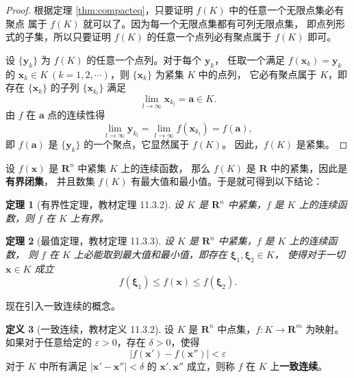 \documentclass[11pt]{ctexart}
\theoremstyle{plain}
\newtheorem{thm}{定理}[section]
\theoremstyle{definition}
\newtheorem{defn}[thm]{定义}
\theoremstyle{remark}
\begin{document}
\begin{proof}
根据定理 \ref{thm:compacteq}，只要证明 \(f(K)\) 中的任意一个无限点集必有聚点
属于 \(f(K)\) 就可以了。因为每一个无限点集都有可列无限点集，
即点列形式的子集，所以只要证明 \(f(K)\) 的任意一个点列必有聚点属于 \(f(K)\) 即可。

设 \(\{\boldsymbol{y}_k\}\) 为 \(f(K)\) 的任意一个点列。对于每个 \(\boldsymbol{y}_k\)，
任取一个满足 \(f(\boldsymbol{x}_k)=\boldsymbol{y}_k\) 的
\(\boldsymbol{x}_k\in K\ (k=1,2,\cdots)\)，则 \(\{\boldsymbol{x}_k\}\) 为紧集 \(K\) 中的点列，
它必有聚点属于 \(K\)，即存在 \(\{\boldsymbol{x}_k\}\) 的子列
\(\{\boldsymbol{x}_{k_l}\}\) 满足
\[
  \lim_{l\to\infty}\boldsymbol{x}_{k_l}=\boldsymbol{a}\in K .
\]
由 \(f\) 在 \(\boldsymbol{a}\) 点的连续性得
\[
  \lim_{l\to\infty}\boldsymbol{y}_{k_l}
  =\lim_{l\to\infty}f(\boldsymbol{x}_{k_l})=f(\boldsymbol{a}),
\]
即 \(f(\boldsymbol{a})\) 是 \(\{\boldsymbol{y}_k\}\) 的一个聚点，它显然属于 \(f(K)\)。
因此，\(f(K)\) 是紧集。
\end{proof}

设 \(f(\boldsymbol{x})\) 是 \(\mathbf{R}^n\) 中紧集 \(K\) 上的连续函数，
那么 \(f(K)\) 是 \(\mathbf{R}\) 中的紧集，因此是\textbf{有界闭集}，
并且数集 \(f(K)\) 有最大值和最小值。于是就可得到以下结论：

\begin{thm}[有界性定理，教材定理 11.3.2]\label{thm:boundedcont}
设 \(K\) 是 \(\mathbf{R}^n\) 中紧集，\(f\) 是 \(K\) 上的连续函数，则 \(f\) 在 \(K\) 上有界。
\end{thm}

\begin{thm}[最值定理，教材定理 11.3.3]\label{thm:extreme}
设 \(K\) 是 \(\mathbf{R}^n\) 中紧集，\(f\) 是 \(K\) 上的连续函数，
则 \(f\) 在 \(K\) 上必能取到最大值和最小值，即存在 \(\boldsymbol{\xi}_1,\boldsymbol{\xi}_2\in K\)，
使得对于一切 \(\boldsymbol{x}\in K\) 成立
\[
  f(\boldsymbol{\xi}_1)\le f(\boldsymbol{x})\le f(\boldsymbol{\xi}_2).
\]
\end{thm}

现在引入一致连续的概念。

\begin{defn}[一致连续，教材定义 11.3.2]\label{def:unifcont}
设 \(K\) 是 \(\mathbf{R}^n\) 中点集，\(f\colon K\to\mathbf{R}^m\) 为映射。
如果对于任意给定的 \(\varepsilon>0\)，存在 \(\delta>0\)，使得
\[
  |f(\boldsymbol{x}')-f(\boldsymbol{x}'')|<\varepsilon
\]
对于 \(K\) 中所有满足 \(|\boldsymbol{x}'-\boldsymbol{x}''|<\delta\) 的
\(\boldsymbol{x}',\boldsymbol{x}''\) 成立，则称 \(f\) 在 \(K\) 上\textbf{一致连续}。
\end{defn}
\end{document}
